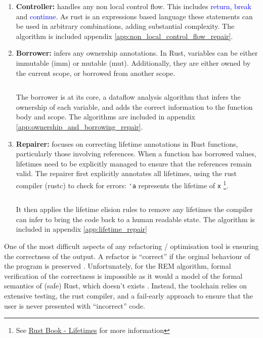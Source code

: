 \begin{enumerate}
    \item \textbf{Controller:} handles any non local control flow. This includes
    \textcolor{blue}{return}, \textcolor{blue}{break} and
    \textcolor{blue}{continue}. As rust is an expressions based language
    \cite{rbooka} these statements can be used in arbitrary
    combinations, adding substantial complexity. The algorithm is included appendix
    \ref{app:non_local_control_flow_repair}.
    \item \textbf{Borrower:} infers any ownership annotations. In Rust,
    variables can be either immutable (imm) or mutable (mut). Additionally, they
    are either owned by the current scope, or borrowed from another scope.
    \inputminted[linenos, tabsize=2]{rust}{snippets/borrow.rs}
    The borrower is at its core, a dataflow analysis algorithm that infers the ownership of each
    variable, and adds the correct information to the function body and scope.
    The algorithms are included in appendix \ref{app:ownership_and_borrowing_repair}.
    \item \textbf{Repairer:} focuses on correcting lifetime annotations in Rust
    functions, particularly those involving references. When a function has
    borrowed values, lifetimes need to be explicitly managed to ensure that the
    references remain valid. The repairer first explicitly annotates all
    lifetimes, using the rust compiler (rustc) to check for errors: \verb|'a|
    represents the lifetime of \verb|x| \footnote{See
    \href{https://doc.rust-lang.org/nomicon/lifetimes.html}{Rust Book - Lifetimes} for more information}.
    \inputminted[]{rust}{snippets/lifetime.rs}
    It then applies the lifetime elision rules \cite{rbookb} to remove any
    lifetimes the compiler can infer to bring the code back to a human readable
    state.
    The algorithm is included in appendix \ref{app:lifetime_repair}
\end{enumerate}

One of the most difficult aspects of any refactoring / optimisation tool is
ensuring the correctness of the output. A refactor is ``correct'' if the orginal
behaviour of the program is preserved \cite{ProvingCompilerOptimisations}.
Unfortunately, for the REM algorithm, formal verification of the correctness is
impossible as it would a model of the formal semantics of (safe) Rust, which
doesn't exists \cite{AdventureOfALifetime}. Instead, the toolchain relies on
extensive testing, the rust compiler, and a fail-early approach to ensure that
the user is never presented with ``incorrect'' code.